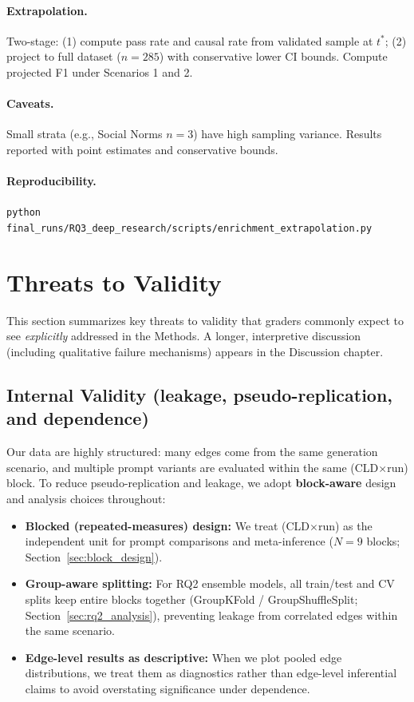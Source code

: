 \paragraph{Extrapolation.}
Two-stage: (1) compute pass rate and causal rate from validated sample at $t^*$; (2) project to full dataset ($n=285$) with conservative lower CI bounds. Compute projected F1 under Scenarios 1 and 2.

\paragraph{Caveats.}
Small strata (e.g., Social Norms $n=3$) have high sampling variance. Results reported with point estimates and conservative bounds.

\paragraph{Reproducibility.}
\texttt{python final\_runs/RQ3\_deep\_research/scripts/enrichment\_extrapolation.py}

\endgroup

\section{Threats to Validity}
\label{sec:threats_to_validity}

This section summarizes key threats to validity that graders commonly expect to see \emph{explicitly} addressed in the Methods. A longer, interpretive discussion (including qualitative failure mechanisms) appears in the Discussion chapter.

\subsection{Internal Validity (leakage, pseudo-replication, and dependence)}
Our data are highly structured: many edges come from the same generation scenario, and multiple prompt variants are evaluated within the same (CLD$\times$run) block. To reduce pseudo-replication and leakage, we adopt \textbf{block-aware} design and analysis choices throughout:
\begin{itemize}[noitemsep]
    \item \textbf{Blocked (repeated-measures) design:} We treat (CLD$\times$run) as the independent unit for prompt comparisons and meta-inference ($N=9$ blocks; Section~\ref{sec:block_design}).
    \item \textbf{Group-aware splitting:} For RQ2 ensemble models, all train/test and CV splits keep entire blocks together (GroupKFold / GroupShuffleSplit; Section~\ref{sec:rq2_analysis}), preventing leakage from correlated edges within the same scenario.
    \item \textbf{Edge-level results as descriptive:} When we plot pooled edge distributions, we treat them as diagnostics rather than edge-level inferential claims to avoid overstating significance under dependence.
\end{itemize}

